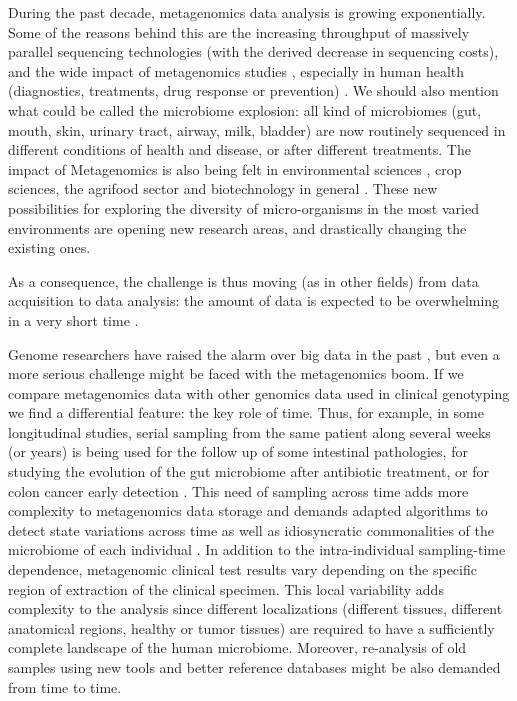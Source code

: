 \documentclass[fontsize=8pt,paper=a4,pagesize,abstracton]{scrartcl}
\begin{document}
During the past decade, metagenomics data analysis is growing
exponentially. Some of the reasons behind this are the increasing
throughput of massively parallel sequencing technologies (with the
derived decrease in sequencing costs), and the wide impact of
metagenomics studies \autocite{oulas2015metagenomics}, especially in
human health (diagnostics, treatments, drug response or prevention)
\autocite{bikel2015combining}. We should also mention what could be
called the microbiome explosion: all kind of microbiomes (gut, mouth,
skin, urinary tract, airway, milk, bladder) are now routinely sequenced
in different conditions of health and disease, or after different
treatments. The impact of Metagenomics is also being felt in
environmental sciences \autocite{ufarte2015discovery}, crop sciences,
the agrifood sector \autocite{coughlan2015biotechnological} and
biotechnology in general \autocite{cowan2015metagenomics}
\autocite{kodzius2015marine}. These new possibilities for exploring the
diversity of micro-organisms in the most varied environments are opening
new research areas, and drastically changing the existing ones.

As a consequence, the challenge is thus moving (as in other fields) from
data acquisition to data analysis: the amount of data is expected to be
overwhelming in a very short time \autocite{stephens2015big}.

Genome researchers have raised the alarm over big data in the past
\autocite{hayden2015genome}, but even a more serious challenge might be
faced with the metagenomics boom. If we compare metagenomics data with
other genomics data used in clinical genotyping we find a differential
feature: the key role of time. Thus, for example, in some longitudinal
studies, serial sampling from the same patient
\autocite{faust2015metagenomics} along several weeks (or years) is being
used for the follow up of some intestinal pathologies, for studying the
evolution of the gut microbiome after antibiotic treatment, or for colon
cancer early detection \autocite{zeller2014potential}
\autocite{garrett2015cancer}. This need of sampling across time adds
more complexity to metagenomics data storage and demands adapted
algorithms to detect state variations across time as well as
idiosyncratic commonalities of the microbiome of each individual
\autocite{franzosa2015identifying}. In addition to the intra-individual
sampling-time dependence, metagenomic clinical test results vary
depending on the specific region of extraction of the clinical specimen.
This local variability adds complexity to the analysis since different
localizations (different tissues, different anatomical regions, healthy
or tumor tissues) are required to have a sufficiently complete landscape
of the human microbiome. Moreover, re-analysis of old samples using new
tools and better reference databases might be also demanded from time to
time.
\end{document}
